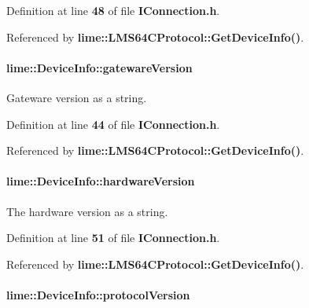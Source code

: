 Definition at line {\bf 48} of file {\bf I\+Connection.\+h}.



Referenced by {\bf lime\+::\+L\+M\+S64\+C\+Protocol\+::\+Get\+Device\+Info()}.

\paragraph[{gateware\+Version}]{ lime\+::\+Device\+Info\+::gateware\+Version}\label{structlime_1_1DeviceInfo_a5872a55a16808b51bfb4133a26953025}


Gateware version as a string. 



Definition at line {\bf 44} of file {\bf I\+Connection.\+h}.



Referenced by {\bf lime\+::\+L\+M\+S64\+C\+Protocol\+::\+Get\+Device\+Info()}.

\paragraph[{hardware\+Version}]{ lime\+::\+Device\+Info\+::hardware\+Version}\label{structlime_1_1DeviceInfo_aea635b385cd60d6de7b6573f9794b73c}


The hardware version as a string. 



Definition at line {\bf 51} of file {\bf I\+Connection.\+h}.



Referenced by {\bf lime\+::\+L\+M\+S64\+C\+Protocol\+::\+Get\+Device\+Info()}.

\paragraph[{protocol\+Version}]{ lime\+::\+Device\+Info\+::protocol\+Version}\label{structlime_1_1DeviceInfo_ad79fb7f91484ec737bd68e1046a523cb}


